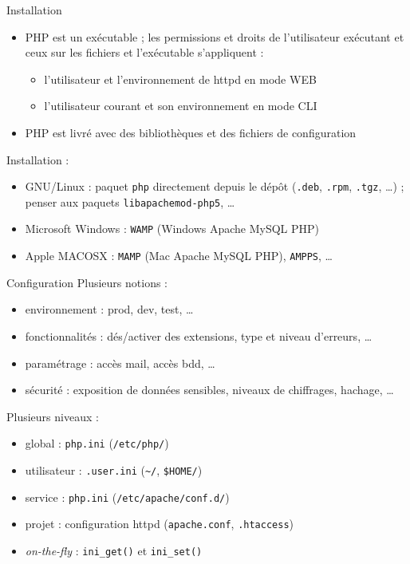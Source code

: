 \begin{frame}{Installation}
	\begin{itemize}
		\item PHP est un exécutable ; les permissions et droits de l'utilisateur exécutant et ceux sur les fichiers et l'exécutable s'appliquent :
			\begin{itemize}
				\item l'utilisateur et l'environnement de httpd en mode WEB
				\item l'utilisateur courant et son environnement en mode CLI
			\end{itemize}
		\item PHP est livré avec des bibliothèques et des fichiers de configuration
	\end{itemize}
	Installation :
	\begin{itemize}
		\item GNU/Linux : paquet \texttt{php} directement depuis le dépôt (\texttt{.deb}, \texttt{.rpm}, \texttt{.tgz}, \ldots) ; penser aux paquets \texttt{libapachemod-php5}, \ldots
		\item Microsoft Windows : \texttt{WAMP} (Windows Apache MySQL PHP)
		\item Apple MACOSX : \texttt{MAMP} (Mac Apache MySQL PHP), \texttt{AMPPS}, \ldots
	\end{itemize}
\end{frame}

\begin{frame}{Configuration}
	Plusieurs notions :
	\begin{itemize}
		\item environnement : prod, dev, test, \ldots
		\item fonctionnalités : dés/activer des extensions, type et niveau d'erreurs, \ldots
		\item paramétrage : accès mail, accès bdd, \ldots
		\item sécurité : exposition de données sensibles, niveaux de chiffrages, hachage, \ldots
	\end{itemize}
	Plusieurs niveaux :
	\begin{itemize}
		\item global : \texttt{php.ini} (\texttt{/etc/php/})
		\item utilisateur : \texttt{.user.ini} (\texttt{\textasciitilde/}, \texttt{\$HOME/})
		\item service : \texttt{php.ini} (\texttt{/etc/apache/conf.d/})
		\item projet : configuration httpd (\texttt{apache.conf}, \texttt{.htaccess})
		\item \emph{on-the-fly} : \texttt{ini\_get()} et \texttt{ini\_set()}
	\end{itemize}
\end{frame}

